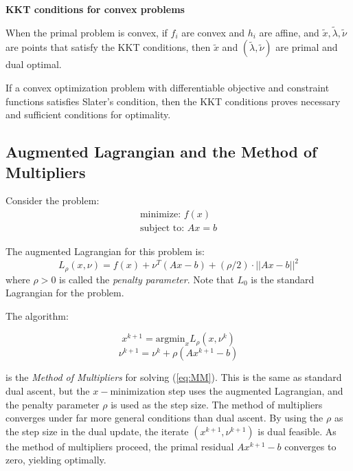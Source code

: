 \documentclass{article}
\begin{document}
\textbf{KKT conditions for convex problems}

When the primal problem is convex, if $f_i$ are convex and $h_i$ are affine, and $\widetilde{x}, \widetilde{\lambda}, \widetilde{\nu}$ are points that satisfy the KKT conditions, then $\widetilde{x}$ and $(\widetilde{\lambda},\widetilde{\nu})$ are primal and dual optimal. 

If a convex optimization problem with differentiable objective and constraint functions satisfies Slater's condition, then the KKT conditions proves necessary and sufficient conditions for optimality.

\subsection{Augmented Lagrangian and the Method of Multipliers}
Consider the problem: \begin{equation} \label{eq:MM}
\begin{array}{l}
\textrm{minimize:	 }  f(x) \\
\textrm{subject to:  } 
Ax = b
\end{array}
\end{equation}

The augmented Lagrangian for this problem is: 
$$L_{\rho}(x,\nu) = f(x) + \nu^T(Ax - b) + (\rho/2) \cdot||Ax - b||^2$$
where $\rho > 0$ is called the \textit{penalty parameter}. Note that $L_0$ is the standard Lagrangian for the problem.

The algorithm: 

\begin{equation}\label{eq:MMx}
    x^{k+1} = \text{argmin}_{x} L_\rho(x,\nu^k) 
\end{equation}
\begin{equation}
    \nu^{k+1} = \nu^k + \rho(Ax^{k+1} - b)
\end{equation}

is the  \textit{Method of Multipliers} for solving (\ref{eq:MM}). This is the same as standard dual ascent, but the $x-$minimization step uses the augmented Lagrangian, and the penalty parameter $\rho$ is used as the step size. The method of multipliers converges under far more general conditions than dual ascent. By using the $\rho$ as the step size in the dual update, the iterate $(x^{k+1}, \nu^{k+1})$ is dual feasible. As the method of multipliers proceed, the primal residual $Ax^{k+1} - b$ converges to zero, yielding optimally. \newline
\end{document}
